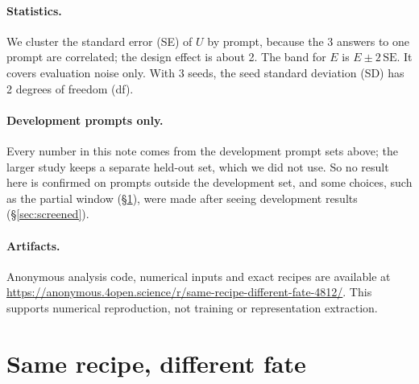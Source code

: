 \documentclass{article}
\begin{document}
\paragraph{Statistics.} We cluster the standard error (SE) of $U$ by prompt,
because the 3 answers to one prompt are correlated; the design effect is about
2. The band for $E$ is $E \pm 2\,\mathrm{SE}$. It covers evaluation noise only.
With 3 seeds, the seed standard deviation (SD) has 2 degrees of freedom (df).

\paragraph{Development prompts only.} Every number in this note comes from the
development prompt sets above; the larger study keeps a separate held-out set,
which we did not use. So no result here is confirmed on prompts outside the
development set, and some choices, such as the partial window
(\S\ref{sec:family}), were made after seeing development results
(\S\ref{sec:screened}).

\paragraph{Artifacts.} Anonymous analysis code, numerical inputs and exact
recipes are available at
\url{https://anonymous.4open.science/r/same-recipe-different-fate-4812/}.
This supports numerical reproduction, not training or representation extraction.

\section{Same recipe, different fate}
\label{sec:family}
\end{document}

